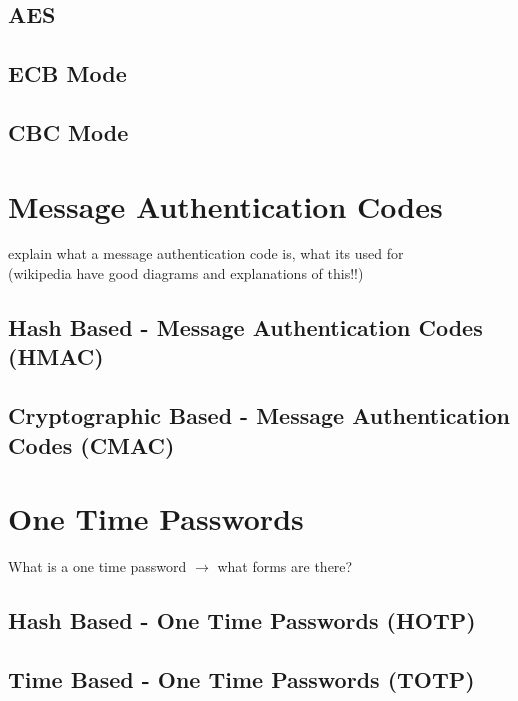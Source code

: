 \documentclass[bsc,frontabs,twoside,singlespacing,parskip,deptreport]{infthesis}     %
\begin{document}
\subsection{AES}

\subsection{ECB Mode}
\subsection{CBC Mode}


\section{Message Authentication Codes}

\noindent explain what a message authentication code is, what its used for\\
\noindent (wikipedia have good diagrams and explanations of this!!)

\subsection{Hash Based - Message Authentication Codes (HMAC)}
\subsection{Cryptographic Based - Message Authentication Codes (CMAC)}

\section{One Time Passwords}

\noindent What is a one time password $\rightarrow$ what forms are there?

\subsection{Hash Based - One Time Passwords (HOTP)}
\subsection{Time Based - One Time Passwords (TOTP)}




\end{document}
